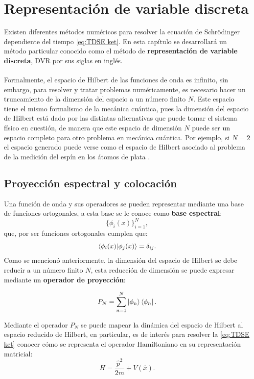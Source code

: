 \chapter{Representación de variable discreta}\label{ch:DVR}
Existen diferentes métodos numéricos para resolver la ecuación de Schrödinger dependiente del tiempo \autoref{eq:TDSE ket}. En esta capítulo se desarrollará un método particular conocido como el método de \textbf{representación de variable discreta}, \acs{DVR} \cite{Light1985,Light1992} por sus siglas en inglés.
\\\\
Formalmente, el espacio de Hilbert de las funciones de onda es infinito, sin embargo, para resolver y tratar problemas numéricamente, es necesario hacer un truncamiento de la dimensión del espacio a un número finito $N$. Este espacio tiene el mismo formalismo de la mecánica cuántica, pues la dimensión del espacio de Hilbert está dado por las distintas alternativas que puede tomar el sistema físico en cuestión, de manera que este espacio de dimensión $N$ puede ser un espacio completo para otro problema en mecánica cuántica. Por ejemplo, si $N=2$ el espacio generado puede verse como el espacio de Hilbert asociado al problema de la medición del espín en los átomos de plata \cite{Gerlach1922}.

\section{Proyección espectral y colocación}
Una función de onda y sus operadores se pueden representar mediante una base de funciones ortogonales, a esta base se le conoce como \textbf{base espectral}:
$$\{\phi_i(x)\}_{i=1}^{N},$$
que, por ser funciones ortogonales cumplen que:
$$\bra{\phi_i(x)}\ket{\phi_j(x)} = \delta_{ij}.$$
Como se mencionó anteriormente, la dimensión del espacio de Hilbert se debe reducir a un número finito $N$, esta reducción de dimensión se puede expresar mediante un \textbf{operador de proyección}:

\begin{equation}
  \label{eq:operadorproyeccion}
  P_N = \sum_{n=1}^N\ket{\phi_n}\bra{\phi_n}.
\end{equation}

Mediante el operador $P_N$ se puede mapear la dinámica del espacio de Hilbert al espacio reducido de Hilbert, en particular, es de interés para resolver la \autoref{eq:TDSE ket} conocer cómo se representa el operador Hamiltoniano en su representación matricial:
\begin{equation}
  \label{eq:Hamiltoniano}
  H = \frac{\hat{p}^2}{2m}+V(\hat{x}).
\end{equation}


